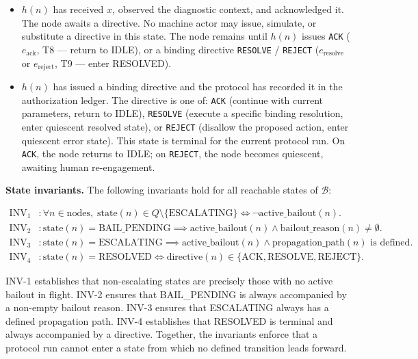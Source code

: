 \begin{itemize}
\item[\textbf{HUMAN\_ACKNOWLEDGED.}] $h(n)$ has received $x$, observed the diagnostic context, and acknowledged it. The node awaits a directive. No machine actor may issue, simulate, or substitute a directive in this state. The node remains until $h(n)$ issues \texttt{ACK} ($e_{\text{ack}}$, T8 --- return to IDLE), or a binding directive \texttt{RESOLVE} / \texttt{REJECT} ($e_{\text{resolve}}$ or $e_{\text{reject}}$, T9 --- enter RESOLVED).

\item[\textbf{RESOLVED.}] $h(n)$ has issued a binding directive and the protocol has recorded it in the authorization ledger. The directive is one of: \texttt{ACK} (continue with current parameters, return to IDLE), \texttt{RESOLVE} (execute a specific binding resolution, enter quiescent resolved state), or \texttt{REJECT} (disallow the proposed action, enter quiescent error state). This state is terminal for the current protocol run. On \texttt{ACK}, the node returns to IDLE; on \texttt{REJECT}, the node becomes quiescent, awaiting human re-engagement.
\end{itemize}

\bigskip
\noindent\textbf{State invariants.} The following invariants hold for all reachable states of $\mathcal{B}$:

\begin{align}
\text{INV}_1 &: \forall n \in \text{nodes},\; \text{state}(n) \in Q \setminus \{\text{ESCALATING}\} \iff \neg\text{active\_bailout}(n). \tag{INV-1} \\
\text{INV}_2 &: \text{state}(n) = \text{BAIL\_PENDING} \implies \text{active\_bailout}(n) \land \text{bailout\_reason}(n) \neq \emptyset. \tag{INV-2} \\
\text{INV}_3 &: \text{state}(n) = \text{ESCALATING} \implies \text{active\_bailout}(n) \land \text{propagation\_path}(n) \text{ is defined}. \tag{INV-3} \\
\text{INV}_4 &: \text{state}(n) = \text{RESOLVED} \iff \text{directive}(n) \in \{\text{ACK}, \text{RESOLVE}, \text{REJECT}\}. \tag{INV-4}
\end{align}

INV-1 establishes that non-escalating states are precisely those with no active bailout in flight. INV-2 ensures that BAIL\_PENDING is always accompanied by a non-empty bailout reason. INV-3 ensures that ESCALATING always has a defined propagation path. INV-4 establishes that RESOLVED is terminal and always accompanied by a directive. Together, the invariants enforce that a protocol run cannot enter a state from which no defined transition leads forward.

